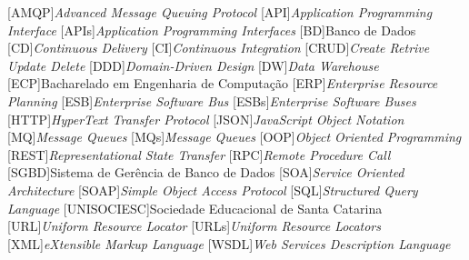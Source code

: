 
[AMQP]{\emph{Advanced Message Queuing Protocol}}
[API]{\emph{Application Programming Interface}}
[APIs]{\emph{Application Programming Interfaces}}
[BD]{Banco de Dados}
[CD]{\emph{Continuous Delivery}}
[CI]{\emph{Continuous Integration}}
[CRUD]{\emph{Create Retrive Update Delete}}
[DDD]{\emph{Domain-Driven Design}}
[DW]{\emph{Data Warehouse}}
[ECP]{Bacharelado em Engenharia de Computação}
[ERP]{\emph{Enterprise Resource Planning}}
[ESB]{\emph{Enterprise Software Bus}}
[ESBs]{\emph{Enterprise Software Buses}}
[HTTP]{\emph{HyperText Transfer Protocol}}
[JSON]{\emph{JavaScript Object Notation}}
[MQ]{\emph{Message Queues}}
[MQs]{\emph{Message Queues}}
[OOP]{\emph{Object Oriented Programming}}
[REST]{\emph{Representational State Transfer}}
[RPC]{\emph{Remote Procedure Call}}
[SGBD]{Sistema de Gerência de Banco de Dados}
[SOA]{\emph{Service Oriented Architecture}}
[SOAP]{\emph{Simple Object Access Protocol}}
[SQL]{\emph{Structured Query Language}}
[UNISOCIESC]{Sociedade Educacional de Santa Catarina}
[URL]{\emph{Uniform Resource Locator}}
[URLs]{\emph{Uniform Resource Locators}}
[XML]{\emph{eXtensible Markup Language}}
[WSDL]{\emph{Web Services Description Language}}

